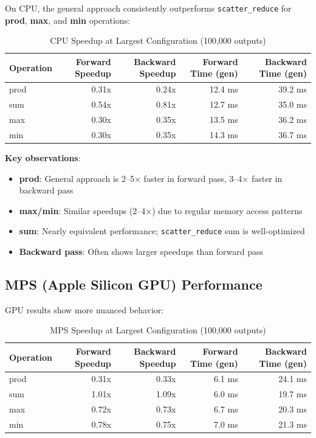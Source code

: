 \documentclass[11pt]{article}
\begin{document}
On CPU, the general approach consistently outperforms \texttt{scatter\_reduce} for \textbf{prod}, \textbf{max}, and \textbf{min} operations:

\begin{table}[H]
\centering
\caption{CPU Speedup at Largest Configuration (100,000 outputs)}
\begin{tabular}{@{}lrrrr@{}}
\toprule
Operation & Forward Speedup & Backward Speedup & Forward Time (gen) & Backward Time (gen) \\
\midrule
prod & 0.31x & 0.24x & 12.4 ms & 39.2 ms \\
sum & 0.54x & 0.81x & 12.7 ms & 35.0 ms \\
max & 0.30x & 0.35x & 13.5 ms & 36.2 ms \\
min & 0.30x & 0.35x & 14.3 ms & 36.7 ms \\
\bottomrule
\end{tabular}
\end{table}

\textbf{Key observations}:
\begin{itemize}
    \item \textbf{prod}: General approach is 2--5$\times$ faster in forward pass, 3--4$\times$ faster in backward pass
    \item \textbf{max/min}: Similar speedups (2--4$\times$) due to regular memory access patterns
    \item \textbf{sum}: Nearly equivalent performance; \texttt{scatter\_reduce} sum is well-optimized
    \item \textbf{Backward pass}: Often shows larger speedups than forward pass
\end{itemize}

\subsection{MPS (Apple Silicon GPU) Performance}

GPU results show more nuanced behavior:

\begin{table}[H]
\centering
\caption{MPS Speedup at Largest Configuration (100,000 outputs)}
\begin{tabular}{@{}lrrrr@{}}
\toprule
Operation & Forward Speedup & Backward Speedup & Forward Time (gen) & Backward Time (gen) \\
\midrule
prod & 0.31x & 0.33x & 6.1 ms & 24.1 ms \\
sum & 1.01x & 1.09x & 6.0 ms & 19.7 ms \\
max & 0.72x & 0.73x & 6.7 ms & 20.3 ms \\
min & 0.78x & 0.75x & 7.0 ms & 21.3 ms \\
\bottomrule
\end{tabular}
\end{table}
\end{document}
